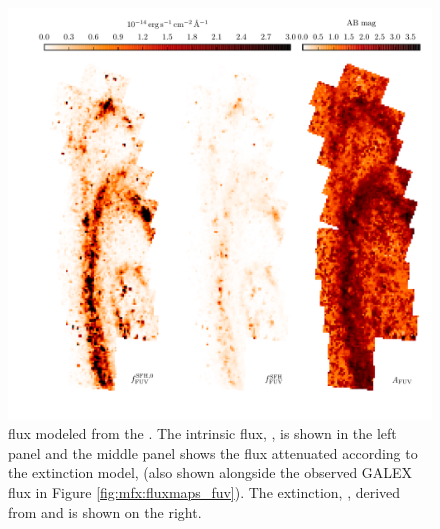 \documentclass[iop, tighten]{emulateapj}
\begin{document}
\begin{figure}
\centering
\includegraphics[width=\textwidth]{m31flux-figures/modfluxmaps_fuv.pdf}
\caption[\fuv{} flux map modeled from the .]{\fuv{} flux modeled from
    the . The intrinsic flux, \ffuvsfhz{}, is shown in the left panel
    and the middle panel shows the flux attenuated according to the extinction
    model, \ffuvsfh{} (also shown alongside the observed GALEX \fuv{} flux in
    Figure \ref{fig:mfx:fluxmaps_fuv}). The \fuv{} extinction, \afuv{}, derived
    from \ffuvsfhz{} and \ffuvsfh{} is shown on the right.
}
\label{fig:mfx:modfluxmaps_fuv}
\end{figure}
\end{document}
